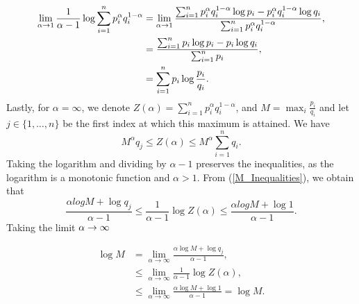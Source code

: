 \begin{equation}
	\begin{aligned}
		\lim_{\alpha \rightarrow 1} \frac{1}{\alpha-1} \log \sum_{i=1}^{n} p_i^\alpha q_i^{1-\alpha} &= \lim_{\alpha \rightarrow 1} \frac{\sum_{i=1}^{n} p_i^\alpha q_i^{1-\alpha} \log p_i - p_i^\alpha q_i^{1-\alpha} \log q_i}{\sum_{i=1}^{n} p_i^\alpha q_i^{1-\alpha}}, \\
		&= \frac{\sum_{i=1}^{n} p_i \log p_i - p_i \log q_i}{\sum_{i=1}^{n} p_i}, \\
		&= \sum_{i=1}^{n} p_i \log \frac{p_i}{q_i}.
	\end{aligned}
	\label{Rényi_1}
\end{equation}
Lastly, for $\alpha=\infty$, we denote $Z(\alpha) = \sum_{i=1}^{n} p_i^\alpha q_i^{1-\alpha}$, and $M = \max_{i} \frac{p_i}{q_i}$ and let $j \in \{1,\dots,n\}$ be the first index at which this maximum is attained. We have
\begin{equation}
	M^\alpha q_j \leq Z(\alpha) \leq M^\alpha \sum_{i=1}^{n} q_i.
	\label{M_Inequalities}
\end{equation}
Taking the logarithm and dividing by $\alpha-1$ preserves the inequalities, as the logarithm is a monotonic function and $\alpha > 1$. From (\ref{M_Inequalities}), we obtain that
\begin{equation*}
	  \frac{\alpha log M + \log q_j}{\alpha-1} \leq \frac{1}{\alpha-1} \log Z(\alpha)  \leq \frac{\alpha log M + \log 1}{\alpha-1}.
\end{equation*}
Taking the limit $\alpha \rightarrow \infty$

\begin{align*}
	\log M &= \lim_{\alpha \to \infty} \frac{\alpha \log M + \log q_j}{\alpha - 1}, \\
	&\leq \lim_{\alpha \to \infty} \frac{1}{\alpha - 1} \log Z(\alpha), \\
	&\leq \lim_{\alpha \to \infty} \frac{\alpha \log M + \log 1}{\alpha - 1} = \log M.
\end{align*}

